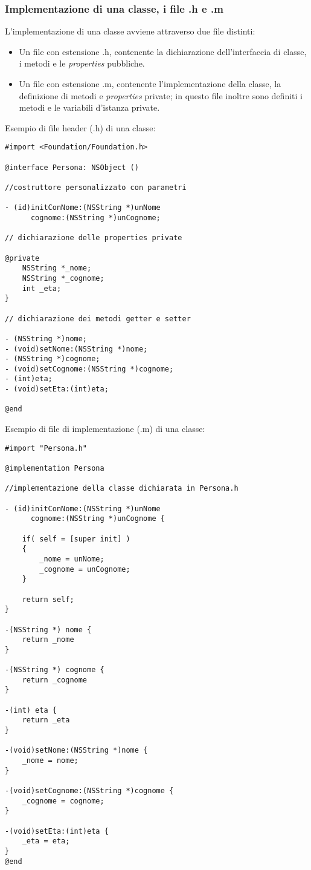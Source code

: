 \subsubsection{Implementazione di una classe, i file .h e .m}
L'implementazione di una classe avviene attraverso due file distinti:
\begin{itemize}
\item Un file con estensione .h, contenente la dichiarazione dell'interfaccia di classe, i metodi e le \textit{properties} pubbliche.
\item Un file con estensione .m, contenente l'implementazione della classe, la definizione di metodi e \textit{properties} private; in questo file inoltre sono definiti i metodi e le variabili d'istanza private.
\end{itemize}
\newpage
Esempio di file header (.h) di una classe:
\lstset{language=[Objective]C, breakindent=40pt, breaklines}
\begin{lstlisting}
#import <Foundation/Foundation.h>

@interface Persona: NSObject ()

//costruttore personalizzato con parametri 

- (id)initConNome:(NSString *)unNome
      cognome:(NSString *)unCognome;

// dichiarazione delle properties private 

@private
	NSString *_nome;
	NSString *_cognome;
	int _eta; 
}

// dichiarazione dei metodi getter e setter

- (NSString *)nome;
- (void)setNome:(NSString *)nome;
- (NSString *)cognome;
- (void)setCognome:(NSString *)cognome;
- (int)eta;
- (void)setEta:(int)eta;

@end
\end{lstlisting}
\bigskip
\bigskip
\bigskip
Esempio di file di implementazione (.m) di una classe:
\lstset{language=[Objective]C, breakindent=40pt, breaklines}
\begin{lstlisting}
#import "Persona.h" 

@implementation Persona

//implementazione della classe dichiarata in Persona.h

- (id)initConNome:(NSString *)unNome
      cognome:(NSString *)unCognome {
    
    if( self = [super init] )
    {
        _nome = unNome;
        _cognome = unCognome;
    }
    
    return self;
}
 
-(NSString *) nome {
	return _nome
}

-(NSString *) cognome {
	return _cognome
}

-(int) eta {
	return _eta
}

-(void)setNome:(NSString *)nome {
	_nome = nome;
}

-(void)setCognome:(NSString *)cognome {
	_cognome = cognome;
}

-(void)setEta:(int)eta {
	_eta = eta;
}
@end
\end{lstlisting}
